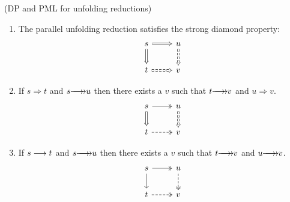 \documentclass[numbers=enddot]{scrartcl}
\newcommand{\LRA}{\Longrightarrow}
\begin{document}
\begin{lemma}(DP and PML for unfolding reductions)
    \label{l:PML}
  \begin{enumerate}
    \item The parallel unfolding reduction satisfies the strong diamond property:
    \[\begin{tikzcd}
      {s} & {u} \\
      {t} & {v}
      \arrow[Rightarrow, from=1-1, to=1-2]
      \arrow[Rightarrow, from=1-1, to=2-1]
      \arrow[Rightarrow, dashed, from=1-2, to=2-2]
      \arrow[Rightarrow, dashed, from=2-1, to=2-2]
    \end{tikzcd}
    \]
    \item If $s \LRA t$ and $s \thra u$ then there exists a $v$ such that $t \thra v$ and $u \LRA v$.
    \[\begin{tikzcd}
      {s} & {u} \\
      {t} & {v}
      \arrow[two heads, from=1-1, to=1-2]
      \arrow[Rightarrow, from=1-1, to=2-1]
      \arrow[Rightarrow, dashed, from=1-2, to=2-2]
      \arrow[two heads, dashed, from=2-1, to=2-2]
    \end{tikzcd}
    \]
    \item If $s \mathrel{\longrightarrow} t$ and $s \thra u$ then there exists a $v$ such that $t \thra v$ and $u \thra v$.
  \[\begin{tikzcd}
    {s} & {u} \\
    {t} & {v}
    \arrow[two heads, from=1-1, to=1-2]
    \arrow[from=1-1, to=2-1]
    \arrow[two heads, dashed, from=1-2, to=2-2]
    \arrow[two heads, dashed, from=2-1, to=2-2]
  \end{tikzcd}
  \]
\end{enumerate}
\end{lemma}
\end{document}
